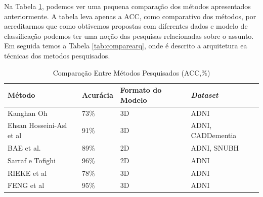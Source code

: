 \documentclass[openright]{UFRGS} %
\begin{document}
Na Tabela \ref{tab:comapreworker}, podemos ver uma pequena comparação dos métodos apresentados anteriormente. A tabela leva apenas a ACC, como comparativo dos métodos, por acreditarmos que como obtivemos propostas com diferentes dados e modelo de classificação podemos ter uma noção das pesquisas
relacionadas  sobre o assunto. Em seguida temos a Tabela \ref{tab:comparearq}, onde é descrito a arquitetura ea técnicas dos metodos pesquisados.


\begin{table}[h]
\centering
\caption{Comparação Entre Métodos Pesquisados  (ACC,\%)}
\label{tab:comapreworker}
\begin{tabular}{|l|l|l|l|}
\hline
\hspace{1cm} \textbf{Método}               & \textbf{Acurácia} & \textbf{Formato do Modelo} & \textit{\textbf{Dataset}}  \\ \hline

Kanghan Oh               &      73\%             &  \hspace{2cm}  3D    &    ADNI                       \\ \hline
Ehsan Hosseini-Asl et al &    91\%                 &  \hspace{2cm}  3D   &  ADNI, CADDementia                           \\ \hline
BAE et al.               &   89\%                 & \hspace{2cm}  2D    &   ADNI, SNUBH                          \\ \hline
Sarraf e Tofighi         &    96\%               &    \hspace{2cm}  2D   &    ADNI                       \\ \hline
RIEKE et al              &      78\%             &  \hspace{2cm}   3D &  ADNI
  \\ \hline
FENG et al             &      95\%             &  \hspace{2cm}   3D   &  ADNI

\\ \hline
\end{tabular}
\end{table}
\end{document}
